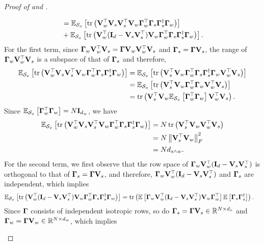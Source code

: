 \begin{proof}[Proof of  and ]
\begin{enumerate}[label=(\alph*)]
\begin{align*}
            &= \E_{\Scal_x}\sbr{\tr\rbr{\Vb_w^\top \Vb_s \Vb_s^\top \Vb_w \Gammab_w^\top \Gammab_s \Gammab_s^\dagger \Gammab_w}} \\
            &+ \E_{\Scal_x}\sbr{\tr\rbr{\Vb_w^\top (\Ib_d - \Vb_s \Vb_s^\top) \Vb_w \Gammab_w^\top \Gammab_s \Gammab_s^\dagger \Gammab_w}}.
        \end{align*}
        For the first term, since $\Gammab_w \Vb_w^\top \Vb_s = \Gammab \Vb_w \Vb_w^\top \Vb_s$ and $\Gammab_s = \Gammab \Vb_s$, the range of $\Gammab_w \Vb_w^\top \Vb_s$ is a subspace of that of $\Gammab_s$ and therefore,
        \begin{align*}
            \E_{\Scal_x}\sbr{\tr\rbr{\Vb_w^\top \Vb_s \Vb_s^\top \Vb_w \Gammab_w^\top \Gammab_s \Gammab_s^\dagger \Gammab_w}} 
            &= \E_{\Scal_x}\sbr{\tr\rbr{ \Vb_s^\top \Vb_w \Gammab_w^\top \Gammab_s \Gammab_s^\dagger \Gammab_w \Vb_w^\top \Vb_s}} \\
            &= \E_{\Scal_x}\sbr{\tr\rbr{ \Vb_s^\top \Vb_w \Gammab_w^\top \Gammab_w \Vb_w^\top \Vb_s}} \\
            &= \tr\rbr{\Vb_s^\top \Vb_w \E_{\Scal_x}\sbr{\Gammab_w^\top \Gammab_w} \Vb_w^\top \Vb_s}.
        \end{align*}
        Since $\E_{\Scal_x}\sbr{\Gammab_w^\top \Gammab_w} = N \Ib_{d_w}$, we have
        \begin{align*}
            \E_{\Scal_x}\sbr{\tr\rbr{\Vb_w^\top \Vb_s \Vb_s^\top \Vb_w \Gammab_w^\top \Gammab_s \Gammab_s^\dagger \Gammab_w}} 
            &= N \tr\rbr{\Vb_s^\top \Vb_w \Vb_w^\top \Vb_s} \\
            &= N \nbr{\Vb_s^\top \Vb_w}_F^2 \\
            &= N d_{s \wedge w}.
        \end{align*}
        For the second term, we first observe that the row space of $\Gammab_w \Vb_w^\top (\Ib_d - \Vb_s \Vb_s^\top)$ is orthogonal to that of $\Gammab_s = \Gammab \Vb_s$, and therefore, $\Gammab_w \Vb_w^\top (\Ib_d - \Vb_s \Vb_s^\top)$ and $\Gammab_s$ are independent, which implies
        \begin{align*}
            \E_{\Scal_x}\sbr{\tr\rbr{\Vb_w^\top (\Ib_d - \Vb_s \Vb_s^\top) \Vb_w \Gammab_w^\top \Gammab_s \Gammab_s^\dagger \Gammab_w}} 
            &= \tr\rbr{\E\sbr{\Gammab_w \Vb_w^\top (\Ib_d - \Vb_s \Vb_s^\top) \Vb_w \Gammab_w^\top} \E\sbr{\Gammab_s \Gammab_s^\dagger}}.
        \end{align*}
        Since $\Gammab$ consists of independent isotropic rows, so do $\Gammab_s = \Gammab \Vb_s \in \R^{N \times d_s}$ and $\Gammab_w = \Gammab \Vb_w \in \R^{N \times d_w}$, which implies

\end{enumerate}
\end{proof}
